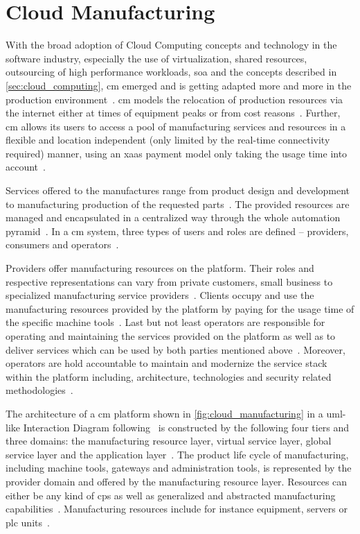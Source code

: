 \documentclass[
a4paper,
twoside,
headsepline,
cleardoublepage=empty,
parskip=half,
draft=false
]{scrbook}
\begin{document}
		\section{Cloud Manufacturing}\label{sec:cloud_manufacturing}

			With the broad adoption of Cloud Computing concepts and technology in the software industry, especially the use of virtualization, shared resources, outsourcing of high performance workloads, \gls{soa} and the concepts described in \cref{sec:cloud_computing}, \gls{cm} emerged and is getting adapted more and more in the production environment~\cite{he2015state}. \gls{cm} models the relocation of production resources via the internet either at times of equipment peaks or from cost reasons~\cite{wu2013cloud}. Further, \gls{cm} allows its users to access a pool of manufacturing services and resources in a flexible and location independent (only limited by the real-time connectivity required) manner, using an \gls{xaas} payment model only taking the usage time into account~\cite{macia2012cloud}.

			Services offered to the manufactures range from product design and development to manufacturing production of the requested parts~\cite{xu2012cloud}. The provided resources  are managed and encapsulated in a centralized way through the whole automation pyramid~\cite{kleinemeier2014automatisierungspyramide}.
			In a \gls{cm} system, three types of users and roles are defined -- providers, consumers and operators~\cite{wu2013cloud}.

			Providers offer manufacturing resources on the platform.
			Their roles and respective representations can vary from private customers, small business to specialized manufacturing service providers~\cite{tao2014cciot}.
			Clients occupy and use the manufacturing resources provided by the platform by paying for the usage time of the specific machine tools~\cite{he2015state}.
			Last but not least operators are responsible for operating and maintaining the services provided on the platform as well as to deliver services which can be used by both parties mentioned above~\cite{xu2012cloud}.
			Moreover, operators are hold accountable to maintain and modernize the service stack within the platform including, architecture, technologies and security related methodologies~\cite{tedeschi2015security}.
			
			The architecture of a \gls{cm} platform shown in \cref{fig:cloud_manufacturing} in a \gls{uml}-like Interaction Diagram following~\cite{uml2017} is constructed by the following four tiers and three domains: the manufacturing resource layer, virtual service layer, global service layer and the application layer~\cite{wu2013cloud}.
			The product life cycle of manufacturing, including machine tools, gateways and administration tools, is represented by the provider domain and offered by the manufacturing resource layer.
			Resources can either be any kind of \gls{cps} as well as generalized and abstracted manufacturing capabilities~\cite{kleinemeier2014automatisierungspyramide}.
			Manufacturing resources include for instance equipment, servers or \gls{plc} units~\cite{xu2012cloud}.
			
\end{document}
